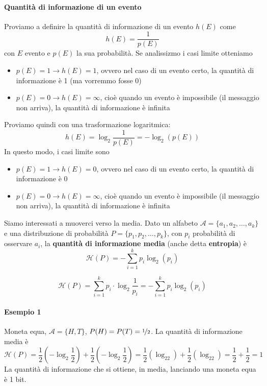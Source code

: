 \paragraph{Quantità di informazione di un evento} Proviamo a definire la quantità di informazione di un evento $h(E)$ come
$$
    h(E) = \frac{1}{p(E)}
$$
con $E$ evento e $p(E)$ la sua probabilità. Se analissizmo i casi limite otteniamo 
\begin{itemize}
    \item $p(E)=1 \to h(E)=1$, ovvero nel caso di un evento certo, la quantità di informazione è 1 (ma vorremmo fosse 0)
    \item $p(E)= 0 \to h(E)=\infty$, cioè quando un evento è impossibile (il messaggio non arriva), la quantità di informazione è infinita
\end{itemize}
Proviamo quindi con una trasformazione logaritmica:
$$
    h(E) = \log_2\frac{1}{p(E)} = -\log_2(p(E))
$$
In questo modo, i casi limite sono 
\begin{itemize}
    \item $p(E)=1 \to h(E)=0$, ovvero nel caso di un evento certo, la quantità di informazione è 0
    \item $p(E)= 0 \to h(E)=\infty$, cioè quando un evento è impossibile (il messaggio non arriva), la quantità di informazione è infinita
\end{itemize}
Siamo interessati a muoverci verso la media. Dato un alfabeto $\mathcal{A}=\{a_1,a_2,\dots,a_k\}$ e una distribuzione di probabilità $P=\{p_1,p_2,\dots,p_k\}$, con $p_i$ probabilità di osservare $a_i$, la \textbf{quantità di informazione media} (anche detta \textbf{entropia}) è
$$
    \mathcal{H}(P) = -\sum_{i=1}^k p_i\log_2(p_i)
$$
\begin{definition}[Entropia]
    $$
    \mathcal{H}(P) = \sum_{i=1}^k p_i\cdot\log_2\frac{1}{p_i} = -\sum_{i=1}^k p_i\log_2(p_i)
    $$
\end{definition}

\paragraph{Esempio 1} Moneta equa, $\mathcal{A}=\{H,T\}$, $P(H)=P(T)=\nicefrac{1}{2}$. La quantità di informazione media è
$$
    \mathcal{H}(P) = \frac{1}{2}\left(-\log_2\frac{1}{2}\right) + \frac{1}{2}\left(-\log_2\frac{1}{2}\right) = 
    \frac{1}{2}(\log_22) + \frac{1}{2}(\log_22)=
    \frac{1}{2}+\frac{1}{2} = 1
$$
La quantità di informazione che si ottiene, in media, lanciando una moneta equa è 1 bit.

